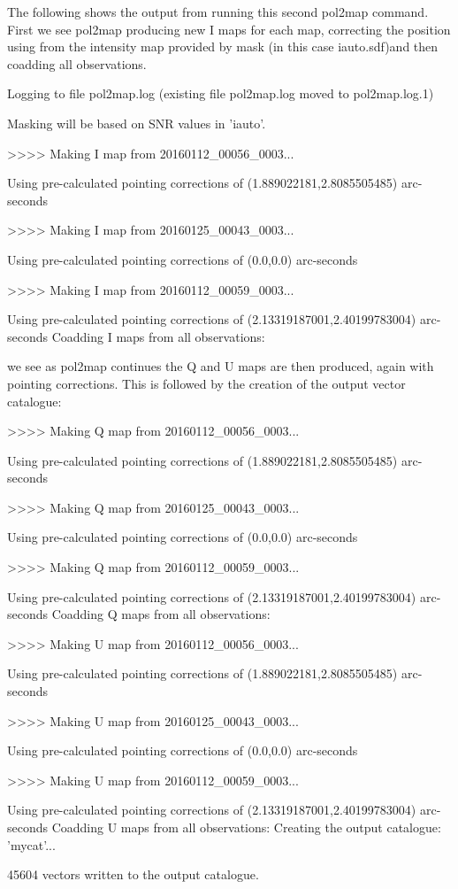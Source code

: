 The following shows the output from running this second pol2map command. First we see pol2map producing
new I maps for each map, correcting the position using from the intensity map provided by mask (in this case iauto.sdf)and then coadding all observations.

\begin{terminalv}
Logging to file pol2map.log
(existing file pol2map.log moved to pol2map.log.1)

Masking will be based on SNR values in 'iauto'.

>>>>   Making I map from 20160112_00056_0003...

   Using pre-calculated pointing corrections of (1.889022181,2.8085505485) arc-seconds

>>>>   Making I map from 20160125_00043_0003...

   Using pre-calculated pointing corrections of (0.0,0.0) arc-seconds

>>>>   Making I map from 20160112_00059_0003...

   Using pre-calculated pointing corrections of (2.13319187001,2.40199783004) arc-seconds
Coadding I maps from all observations:
\end{terminalv}

we see as pol2map continues the Q and U maps are then produced, again with pointing corrections. This is followed by the creation of
the output vector catalogue:

\begin{terminalv}
>>>>   Making Q map from 20160112_00056_0003...

   Using pre-calculated pointing corrections of (1.889022181,2.8085505485) arc-seconds

>>>>   Making Q map from 20160125_00043_0003...

   Using pre-calculated pointing corrections of (0.0,0.0) arc-seconds

>>>>   Making Q map from 20160112_00059_0003...

   Using pre-calculated pointing corrections of (2.13319187001,2.40199783004) arc-seconds
Coadding Q maps from all observations:

>>>>   Making U map from 20160112_00056_0003...

   Using pre-calculated pointing corrections of (1.889022181,2.8085505485) arc-seconds

>>>>   Making U map from 20160125_00043_0003...

   Using pre-calculated pointing corrections of (0.0,0.0) arc-seconds

>>>>   Making U map from 20160112_00059_0003...

   Using pre-calculated pointing corrections of (2.13319187001,2.40199783004) arc-seconds
Coadding U maps from all observations:
Creating the output catalogue: 'mycat'...

45604 vectors written to the output catalogue.
\end{terminalv}



